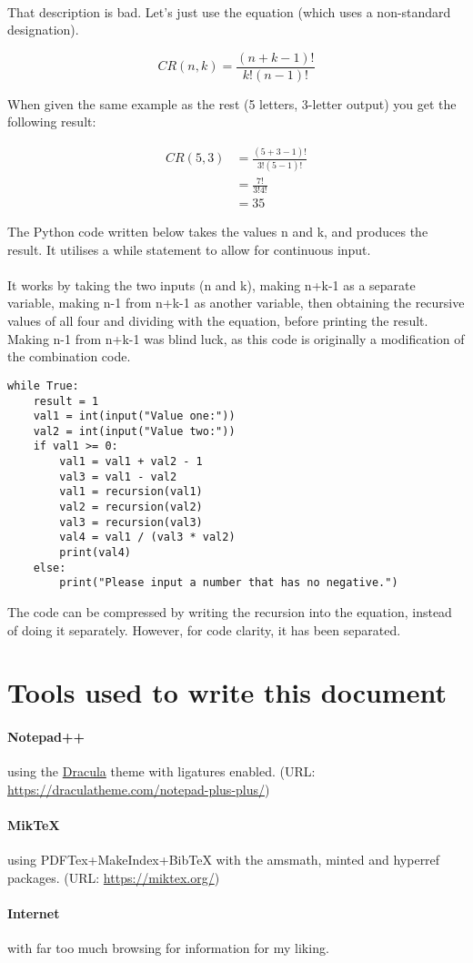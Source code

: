 \documentclass{article}
\begin{document}
	\paragraph{}
	That description is bad. Let's just use the equation (which uses a non-standard designation).
	
	\begin{equation*}
	CR(n,k) = \frac{(n+k-1)!}{k!(n-1)!}
	\end{equation*}
	
	When given the same example as the rest (5 letters, 3-letter output) you get the following result:
	
	\begin{align*}
	CR(5,3) & = \frac{(5+3-1)!}{3!(5-1)!}\\
	& = \frac{7!}{3!4!} \\
	& = 35
	\end{align*}
	
	The Python code written below takes the values n and k, and produces
	the result. It utilises a while statement to allow for continuous input.
	
	\paragraph{}
	It works by taking the two inputs (n and k), making n+k-1 as a separate variable, making n-1 from n+k-1 as another variable,
	then obtaining the recursive values of all four and dividing with the equation, before printing the result.
	Making n-1 from n+k-1 was blind luck, as this code is originally a modification of the combination code.
	
	\begin{verbatim}
while True:
	result = 1
	val1 = int(input("Value one:"))
	val2 = int(input("Value two:"))
	if val1 >= 0:
		val1 = val1 + val2 - 1
		val3 = val1 - val2
		val1 = recursion(val1)
		val2 = recursion(val2)
		val3 = recursion(val3)
		val4 = val1 / (val3 * val2)
		print(val4)
	else:
		print("Please input a number that has no negative.")
	\end{verbatim}
	
	The code can be compressed by writing the recursion into the equation, instead of doing it separately.
	However, for code clarity, it has been separated.	
	
	\section{Tools used to write this document}
	\paragraph{Notepad++}
	using the \href{https://draculatheme.com/notepad-plus-plus/}{Dracula} theme
	with ligatures enabled. (URL: \url{https://draculatheme.com/notepad-plus-plus/})
	\paragraph{MikTeX}
	using PDFTex+MakeIndex+BibTeX with the amsmath, minted and hyperref packages.
	(URL: \url{https://miktex.org/})
	\paragraph{Internet}
	with far too much browsing for information for my liking.
	
\end{document}
